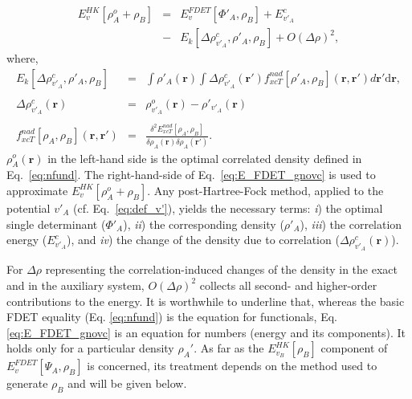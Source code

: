 \documentclass[amsmath,amssymb,preprint,aip,jcp]{revtex4-1}
\begin{document}
\begin{eqnarray} \label{eq:E_FDET_gnovc}
 E_{v}^{HK}[\rho_A^{o}+\rho_B] &=& E_{v}^{FDET}[\Phi'_{A},\rho_B] + E^{c}_{v'_A} 
 \\ \nonumber
 &-& E_k[\Delta \rho^{c}_{v'_A}, \rho'_A, \rho_B] + O(\Delta\rho)^2, 
 \end{eqnarray}
where,
\begin{eqnarray}
\label{eq:nkernel}
 E_k[\Delta \rho^{c}_{v'_A}, \rho'_A, \rho_B] &=&
 \int \rho'_A(\mathbf{r}) \int \Delta \rho^{c}_{v'_A}(\mathbf{r'}) f^{nad}_{xcT}[\rho'_A, \rho_B](\mathbf{r},\mathbf{r'})d\mathbf{r'}\mathrm{d}\mathbf{r},\\
 \nonumber \\ \label{eq:def_corrdens}
 \Delta \rho^{c}_{v'_A}(\mathbf{r})&=&\rho^{o}_{v'_A}(\mathbf{r})-\rho'_{v'_A}(\mathbf{r})\\
 \nonumber \\
 \label{eq:nf_nad}
 f^{nad}_{xcT}[\rho_A, \rho_B](\mathbf{r},\mathbf{r'}) &=& \frac{\delta^2 E^{nad}_{xcT}[\rho_A, \rho_B]}{\delta \rho_A(\mathbf{r}) \delta \rho_A(\mathbf{r'})}.
\end{eqnarray}
$\rho_A^{o}(\mathbf{r})$ in the left-hand side is the optimal correlated density defined in Eq.~\ref{eq:nfund}. 
The right-hand-side of Eq.~\ref{eq:E_FDET_gnovc} is used to approximate $E_{v}^{HK}[\rho_A^{o}+\rho_B]$.
Any post-Hartree-Fock method, applied to the potential $v'_A$ (cf. Eq.~\ref{eq:def_v'}), yields the necessary terms: {\it i})
the optimal single determinant ($\Phi'_{A}$), {\it ii}) the corresponding density ($\rho'_{A}$), 
{\it iii}) the correlation energy ($E^{c}_{v'_A}$), and {\it iv}) the change of the density due to correlation ($\Delta \rho^{c}_{v'_A}(\mathbf{r})$). 

For $\Delta\rho$ representing the correlation-induced changes of the density in the exact and in the auxiliary system, 
 $O(\Delta\rho)^2$ collects all second- and higher-order contributions to the energy. 
 {\color{red} It is worthwhile to underline that, whereas the basic FDET equality (Eq. \ref{eq:nfund}) is the equation for functionals, Eq. \ref{eq:E_FDET_gnovc} is an equation for numbers (energy and its components). It holds only for a particular density $\rho_A'$.}
As far as the $E^{HK}_{v_B}[\rho_B]$ component of ${ E}_{v}^{FDET}[\Psi_{A},\rho_B]$ is concerned,
its treatment depends on the method used to generate $\rho_B$ and will be given below.
\end{document}
